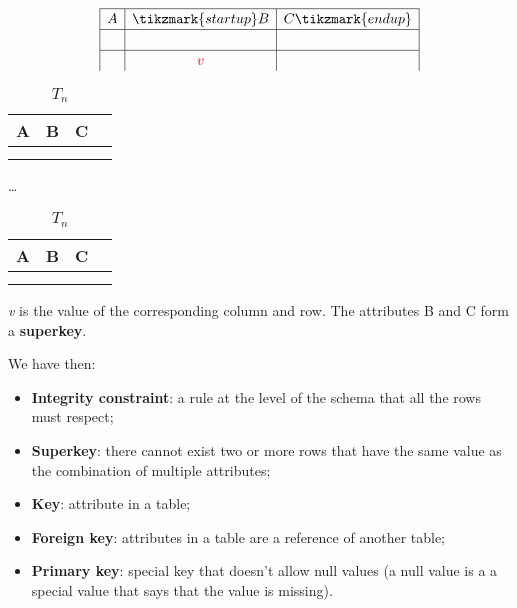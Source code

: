 \vspace{2em}
\begin{table}[ht!]
    \parbox{.30\linewidth}{
        \centering
        \[
        \renewcommand\arraystretch{1.2}
        \begin{array}{|c|c|c|}
            \hline
            A & \tikzmark{startup}B & C\tikzmark{endup} \\
            \hline
            &  &  \\ 
            \hline
            &  \color{red}{v} &  \\ 
        \end{array}
        \]

        \captionsetup{labelformat=empty}
        \caption*{$T_1$}
    }
    \hfill
    \parbox{.30\linewidth}{
        \centering
        \begin{tabular}{ |c|c|c|c| } 
            \hline
                A & B & C \\
            \hline
                &  &  \\ 
            \hline
                &  &  \\ 
        \end{tabular}
        \captionsetup{labelformat=empty}
        \caption{$T_2$}
    }
    \dots
    \parbox{.30\linewidth}{
        \centering
        \begin{tabular}{ |c|c|c|c| } 
            \hline
                A & B & C \\
            \hline
                &  &  \\ 
            \hline
                &  &  \\ 
        \end{tabular}
        \captionsetup{labelformat=empty}
        \caption*{$T_n$}
    }
\end{table}
\vspace{2em}
{\it\color{red}v} is the value of the corresponding column and row. The attributes B and C form a \textbf{superkey}.

\vspace{1em}
We have then:
\begin{itemize}
    \item \textbf{Integrity constraint}: a rule at the level of the schema that all the rows must respect;
    \item \textbf{Superkey}: there cannot exist two or more rows that have the same value as the combination of multiple attributes;
    \item \textbf{Key}: attribute in a table;
    \item \textbf{Foreign key}: attributes in a table are a reference of another table;
    \item \textbf{Primary key}: special key that doesn't allow null values (a null value is a a special value that says that the value is missing).
\end{itemize}

